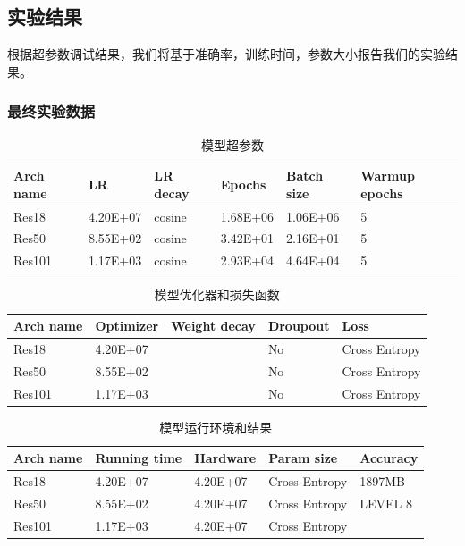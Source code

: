 \documentclass[hyperref, UTF8, 12pt]{article}
\theoremstyle{definition}
\begin{document}
\subsection{实验结果}
根据超参数调试结果，我们将基于准确率，训练时间，参数大小报告我们的实验结果。
\subsubsection{最终实验数据}
\begin{table}[h]
	\centering
	\caption{模型超参数}
	\begin{tabular}{l|l|l|l|l|l}
		\toprule
		Arch name & LR       & LR decay & Epochs   & Batch size & Warmup epochs \\ \midrule
		Res18     & 4.20E+07 & cosine   & 1.68E+06 & 1.06E+06   & 5             \\ \midrule
		Res50     & 8.55E+02 & cosine   & 3.42E+01 & 2.16E+01   & 5              \\ \midrule
		Res101    & 1.17E+03 & cosine   & 2.93E+04 & 4.64E+04   &  5            \\ \bottomrule
	\end{tabular}
\end{table}

\begin{table}[h]
	\centering
	\caption{模型优化器和损失函数}
	\begin{tabular}{l|l|l|l|l}
		\toprule
		Arch name & Optimizer& Weight decay & Droupout   & Loss           \\ \midrule
		Res18     & 4.20E+07 &         	    & No 	     & Cross Entropy  \\ \midrule
		Res50     & 8.55E+02 &              & No         & Cross Entropy  \\ \midrule
		Res101    & 1.17E+03 &              & No         & Cross Entropy  \\ \bottomrule
	\end{tabular}
\end{table}

\begin{table}[h]
	\centering
	\caption{模型运行环境和结果}
	\begin{tabular}{l|l|l|l|l}
		\toprule
		Arch name & Running time & Hardware     & Param size     & Accuracy 	 \\ \midrule
		Res18     & 4.20E+07     & 4.20E+07     & Cross Entropy  & 1897MB        \\ \midrule
		Res50     & 8.55E+02     & 4.20E+07     & Cross Entropy  & LEVEL 8       \\ \midrule
		Res101    & 1.17E+03     & 4.20E+07      & Cross Entropy &               \\ \bottomrule
	\end{tabular}
\end{table}
\end{document}
